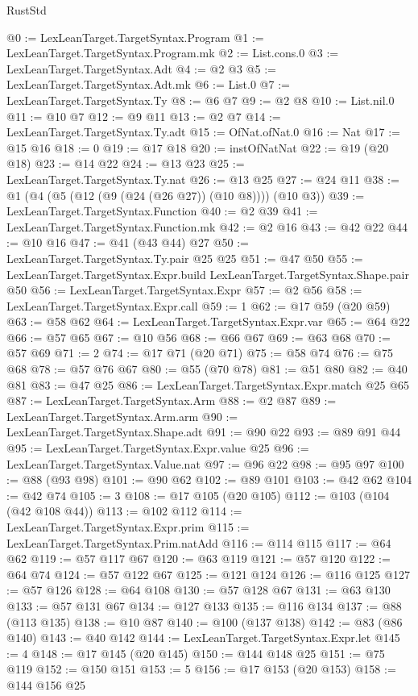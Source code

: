\begin{lexlean}{RustStd}
\begin{coremodule}
{\begin{coremodule}
{{{{{{{@0 := LexLeanTarget.TargetSyntax.Program
@1 := LexLeanTarget.TargetSyntax.Program.mk
@2 := List.cons.{0}
@3 := LexLeanTarget.TargetSyntax.Adt
@4 := @2 @3
@5 := LexLeanTarget.TargetSyntax.Adt.mk
@6 := List.{0}
@7 := LexLeanTarget.TargetSyntax.Ty
@8 := @6 @7
@9 := @2 @8
@10 := List.nil.{0}
@11 := @10 @7
@12 := @9 @11
@13 := @2 @7
@14 := LexLeanTarget.TargetSyntax.Ty.adt
@15 := OfNat.ofNat.{0}
@16 := Nat
@17 := @15 @16
@18 := 0
@19 := @17 @18
@20 := instOfNatNat
@22 := @19 (@20 @18)
@23 := @14 @22
@24 := @13 @23
@25 := LexLeanTarget.TargetSyntax.Ty.nat
@26 := @13 @25
@27 := @24 @11
@38 := @1 (@4 (@5 (@12 (@9 (@24 (@26 @27)) (@10 @8)))) (@10 @3))
@39 := LexLeanTarget.TargetSyntax.Function
@40 := @2 @39
@41 := LexLeanTarget.TargetSyntax.Function.mk
@42 := @2 @16
@43 := @42 @22
@44 := @10 @16
@47 := @41 (@43 @44) @27
@50 := LexLeanTarget.TargetSyntax.Ty.pair @25 @25
@51 := @47 @50
@55 := LexLeanTarget.TargetSyntax.Expr.build LexLeanTarget.TargetSyntax.Shape.pair @50
@56 := LexLeanTarget.TargetSyntax.Expr
@57 := @2 @56
@58 := LexLeanTarget.TargetSyntax.Expr.call
@59 := 1
@62 := @17 @59 (@20 @59)
@63 := @58 @62
@64 := LexLeanTarget.TargetSyntax.Expr.var
@65 := @64 @22
@66 := @57 @65
@67 := @10 @56
@68 := @66 @67
@69 := @63 @68
@70 := @57 @69
@71 := 2
@74 := @17 @71 (@20 @71)
@75 := @58 @74
@76 := @75 @68
@78 := @57 @76 @67
@80 := @55 (@70 @78)
@81 := @51 @80
@82 := @40 @81
@83 := @47 @25
@86 := LexLeanTarget.TargetSyntax.Expr.match @25 @65
@87 := LexLeanTarget.TargetSyntax.Arm
@88 := @2 @87
@89 := LexLeanTarget.TargetSyntax.Arm.arm
@90 := LexLeanTarget.TargetSyntax.Shape.adt
@91 := @90 @22
@93 := @89 @91 @44
@95 := LexLeanTarget.TargetSyntax.Expr.value @25
@96 := LexLeanTarget.TargetSyntax.Value.nat
@97 := @96 @22
@98 := @95 @97
@100 := @88 (@93 @98)
@101 := @90 @62
@102 := @89 @101
@103 := @42 @62
@104 := @42 @74
@105 := 3
@108 := @17 @105 (@20 @105)
@112 := @103 (@104 (@42 @108 @44))
@113 := @102 @112
@114 := LexLeanTarget.TargetSyntax.Expr.prim
@115 := LexLeanTarget.TargetSyntax.Prim.natAdd
@116 := @114 @115
@117 := @64 @62
@119 := @57 @117 @67
@120 := @63 @119
@121 := @57 @120
@122 := @64 @74
@124 := @57 @122 @67
@125 := @121 @124
@126 := @116 @125
@127 := @57 @126
@128 := @64 @108
@130 := @57 @128 @67
@131 := @63 @130
@133 := @57 @131 @67
@134 := @127 @133
@135 := @116 @134
@137 := @88 (@113 @135)
@138 := @10 @87
@140 := @100 (@137 @138)
@142 := @83 (@86 @140)
@143 := @40 @142
@144 := LexLeanTarget.TargetSyntax.Expr.let
@145 := 4
@148 := @17 @145 (@20 @145)
@150 := @144 @148 @25
@151 := @75 @119
@152 := @150 @151
@153 := 5
@156 := @17 @153 (@20 @153)
@158 := @144 @156 @25
}}}}}}}
\end{coremodule}}
\end{coremodule}
\end{lexlean}
